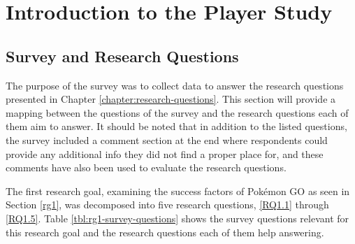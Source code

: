 
\chapter{Introduction to the Player Study}

\label{chapter:player-study-introduction}

\section{Survey and Research Questions}


The purpose of the survey was to collect data to answer the research questions presented in Chapter \ref{chapter:research-questions}. This section will provide a mapping between the questions of the survey and the research questions each of them aim to answer. It should be noted that in addition to the listed questions, the survey included a comment section at the end where respondents could provide any additional info they did not find a proper place for, and these comments have also been used to evaluate the research questions.

The first research goal, examining the success factors of Pokémon GO as seen in Section \ref{rg1}, was decomposed into five research questions, \ref{RQ1.1} through \ref{RQ1.5}. Table \ref{tbl:rg1-survey-questions} shows the survey questions relevant for this research goal and the research questions each of them help answering.

